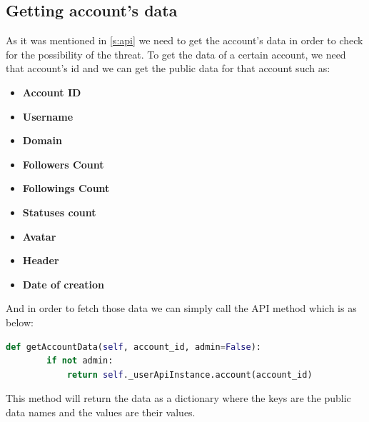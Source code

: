 \subsection{Getting account's data}\label{ss:acc_data}
As it was mentioned in \ref{s:api} we need to get the account's data in order to check for the possibility of the threat. To get the data of a certain account, we need that account's id and we can get the public data for that account such as:
\begin{itemize}
	\item \textbf{Account ID}
	\item \textbf{Username}
	\item \textbf{Domain}
	\item \textbf{Followers Count}
	\item \textbf{Followings Count}
	\item \textbf{Statuses count}
	\item \textbf{Avatar}
	\item \textbf{Header}
	\item \textbf{Date of creation}
\end{itemize}
And in order to fetch those data we can simply call the API method which is as below:
\\[5pt]
\begin{lstlisting}[language=python, caption={Fetching certain account's public data}, captionpos=b]
	def getAccountData(self, account_id, admin=False):
		if not admin:
			return self._userApiInstance.account(account_id)
\end{lstlisting}
This method will return the data as a dictionary where the keys are the public data names and the values are their values.
